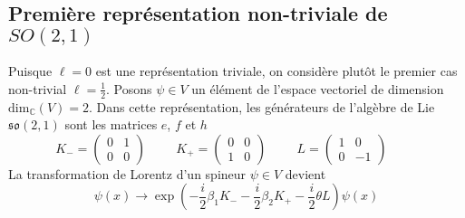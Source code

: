 \documentclass{article}
\numberwithin{equation}{section}
\theoremstyle{solution}
\begin{document}
\subsection{Première représentation non-triviale de $SO(2, 1)$}
Puisque $\ell=0$ est une représentation triviale, on considère plutôt le premier cas non-trivial $\ell=\frac{1}{2}$. 
Posons $\psi \in V$ un élément de l'espace vectoriel de dimension $\mathrm{dim}_{\mathbb{C}}(V) = 2$. Dans cette représentation, les générateurs 
de l'algèbre de Lie $\mathfrak{so}(2, 1)$ sont les matrices $e$, $f$ et $h$
\begin{equation}
        K_{-} = 
        \begin{pmatrix}
        0 & 1 \\
        0 & 0
        \end{pmatrix}
        \hspace{1cm}
        K_{+} = 
        \begin{pmatrix}
        0 & 0 \\
        1 & 0
        \end{pmatrix}
        \hspace{1cm}
        L = 
        \begin{pmatrix}
        1 & 0 \\
        0 & -1
        \end{pmatrix}
        \hspace{1cm}
\end{equation} 
La transformation de Lorentz d'un spineur $\psi \in V$ devient
\begin{equation}
        \psi(x) \rightarrow \exp(-\frac{i}{2} \beta_1 K_{-} - \frac{i}{2}\beta_2 K_{+} - \frac{i}{2}\theta L) \psi(x)
\end{equation} 

\subsection{}
\end{document}
